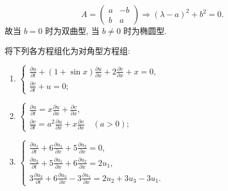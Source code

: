\begin{solve}
  \[A = \begin{pmatrix}
    a & -b \\
    b & a
  \end{pmatrix} \Rightarrow (\lambda-a)^2+b^2 = 0.\]
  故当 $b=0$ 时为双曲型, 当 $b\neq 0$ 时为椭圆型.
\end{solve}


\begin{exercise}
  将下列各方程组化为对角型方程组:
  \begin{enumerate}[(1)]
    \item $\begin{cases}
             \frac{\partial u}{\partial t} + (1+\sin x)\frac{\partial u}{\partial x}
                + 2 \frac{\partial v}{\partial x} + x = 0, \\
             \frac{\partial v}{\partial t} + u = 0;  
           \end{cases}$
    \item $\begin{cases}
             \frac{\partial u}{\partial t} = x \frac{\partial u}{\partial x}
               + \frac{\partial v}{\partial x}, \\
             \frac{\partial v}{\partial t} = a^2 \frac{\partial u}{\partial x}
               + x \frac{\partial v}{\partial x}\quad (a>0);
           \end{cases}$
    \item $\begin{cases}
             \frac{\partial u_1}{\partial t} + 6 \frac{\partial u_1}{\partial x}
               + 5 \frac{\partial u_2}{\partial x} = 0, \\
             \frac{\partial u_2}{\partial t} + 5 \frac{\partial u_1}{\partial x}
               + 6 \frac{\partial u_2}{\partial x} = 2u_1, \\
             3 \frac{\partial u_3}{\partial t} + 6 \frac{\partial u_3}{\partial x}
               - 3 \frac{\partial u_1}{\partial x} = 2u_2 + 3u_3 - 3u_1.
           \end{cases}$
  \end{enumerate}
\end{exercise}

